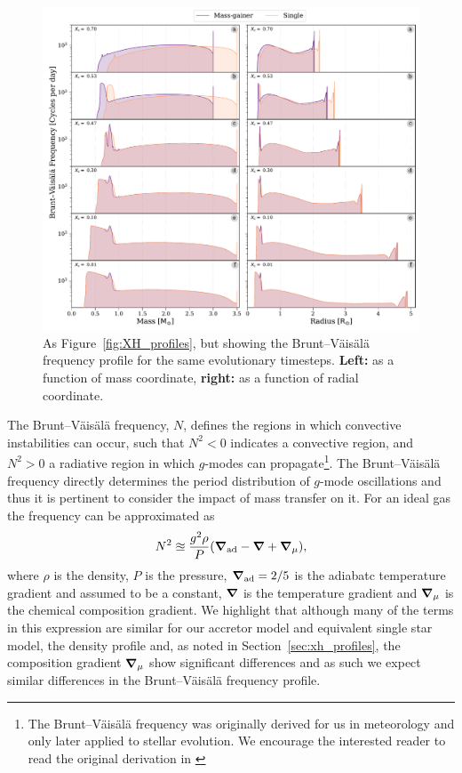 \documentclass[twocolumn, twocolappendix, oneside]{aastex631}
\newcommand{\bvf}{Brunt–Väisälä frequency\xspace}
\newcommand{\gmode}{$g$-mode\xspace}
\newcommand{\gmodes}{$g$-modes\xspace}
\begin{document}
\begin{figure}
    \centering
    \includegraphics[width=\textwidth]{figures/BV_profile_all_combo.pdf}
    \caption{As Figure~\ref{fig:XH_profiles}, but showing the \bvf profile for the same evolutionary timesteps. \textbf{Left:} as a function of mass coordinate, \textbf{right:} as a function of radial coordinate.}
    \label{fig:BV_profiles}
\end{figure}

The \bvf \citep{BVF-vaisala, BVF-brunt}, $N$, defines the regions in which convective instabilities can occur, such that $N^2 < 0$ indicates a convective region, and $N^2 > 0$ a radiative region in which \gmodes can propagate\footnote{The \bvf was originally derived for us in meteorology and only later applied to stellar evolution. We encourage the interested reader to read the original derivation in \citet{BVF-brunt}}. The \bvf directly determines the period distribution of \gmode oscillations and thus it is pertinent to consider the impact of mass transfer on it. For an ideal gas the frequency can be approximated as
\begin{equation}\label{eq:bvf}
    N^2 \approxeq \frac{g^2 \rho}{P} \qty(\grad_{\rm ad} - \grad + \grad_\mu),
\end{equation}
where $\rho$ is the density, $P$ is the pressure, $\grad_{\rm ad} = 2/5$ is the adiabatc temperature gradient and assumed to be a constant, $\grad$ is the temperature gradient and $\grad_\mu$ is the chemical composition gradient. We highlight that although many of the terms in this expression are similar for our accretor model and equivalent single star model, the density profile and, as noted in Section~\ref{sec:xh_profiles}, the composition gradient $\grad_\mu$ show significant differences and as such we expect similar differences in the \bvf profile.
\end{document}

